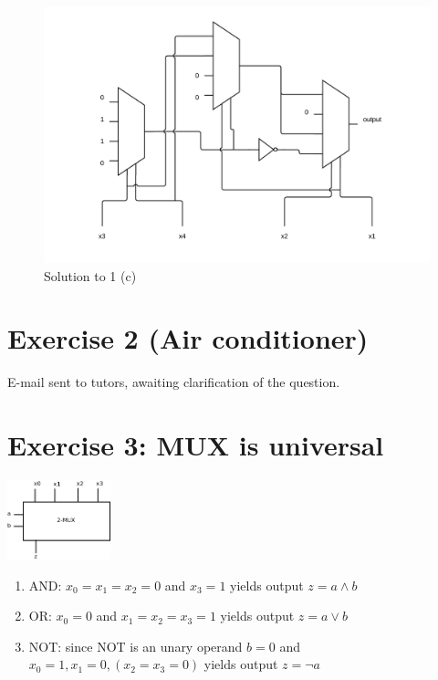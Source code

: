 \documentclass[10pt,a4paper]{scrartcl}
\begin{document}
\vspace{1em}
\begin{figure}[h]
  \centering\includegraphics[width=\linewidth]{images/exercise_3_1_c.png}
  \caption{Solution to 1 (c)}
\end{figure}
\vspace{1em}

\FloatBarrier
\section*{Exercise 2 (Air conditioner)}
E-mail sent to tutors, awaiting clarification of the question.

\section*{Exercise 3: MUX is universal}

\includegraphics[width=3cm]{images/3-3.png}
\begin{enumerate}
 \item AND: $x_0=x_1=x_2=0$ and $x_3 = 1$ yields output $z = a \land b$
 \item OR: $x_0 = 0$ and $x_1=x_2=x_3= 1$ yields output $z = a \lor b$
 \item NOT: since NOT is an unary operand $b=0$ and $x_0=1, x_1=0, (x_2=x_3=0)$ yields output $z = \lnot a$
\end{enumerate}
\end{document}
